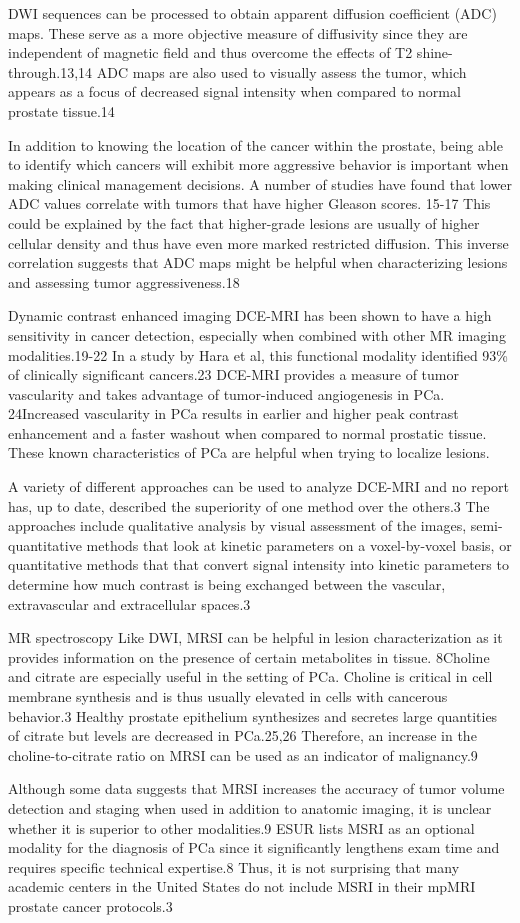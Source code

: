  DWI sequences can be processed to obtain apparent diffusion coefficient (ADC) maps. These serve as a more objective measure of diffusivity since they are independent of magnetic field and thus overcome the effects of T2 shine-through.13,14  ADC maps are also used to visually assess the tumor, which appears as a focus of decreased signal intensity when compared to normal prostate tissue.14 

 In addition to knowing the location of the cancer within the prostate, being able to identify which cancers will exhibit more aggressive behavior is important when making clinical management decisions. A number of studies have found that lower ADC values correlate with tumors that have higher Gleason scores. 15-17 This could be explained by the fact that higher-grade lesions are usually of higher cellular density and thus have even more marked restricted diffusion. This inverse correlation suggests that ADC maps might be helpful when characterizing lesions and assessing tumor aggressiveness.18 

 Dynamic contrast enhanced imaging
 DCE-MRI has been shown to have a high sensitivity in cancer detection, especially when combined with other MR imaging modalities.19-22 In a study by Hara et al, this functional modality identified 93\% of clinically significant cancers.23 DCE-MRI provides a measure of tumor vascularity and takes advantage of tumor-induced angiogenesis in PCa. 24Increased vascularity in PCa results in earlier and higher peak contrast enhancement and a faster washout when compared to normal prostatic tissue. These known characteristics of PCa are helpful when trying to localize lesions. 

 A variety of different approaches can be used to analyze DCE-MRI and no report has, up to date, described the superiority of one method over the others.3 The approaches include qualitative analysis by visual assessment of the images, semi-quantitative methods that look at kinetic parameters on a voxel-by-voxel basis, or quantitative methods that that convert signal intensity into kinetic parameters to determine how much contrast is being exchanged between the vascular, extravascular and extracellular spaces.3
    
    MR spectroscopy
    Like DWI, MRSI can be helpful in lesion characterization as it provides information on the presence of certain metabolites in tissue. 8Choline and citrate are especially useful in the setting of PCa. Choline is critical in cell membrane synthesis and is thus usually elevated in cells with cancerous behavior.3 Healthy prostate epithelium synthesizes and secretes large quantities of citrate but levels are decreased in PCa.25,26 Therefore, an increase in the choline-to-citrate ratio on MRSI can be used as an indicator of malignancy.9 

    Although some data suggests that MRSI increases the accuracy of tumor volume detection and staging when used in addition to anatomic imaging, it is unclear whether it is superior to other modalities.9 ESUR lists MSRI as an optional modality for the diagnosis of PCa since it significantly lengthens exam time and requires specific technical expertise.8 Thus, it is not surprising that many academic centers in the United States do not include MSRI in their mpMRI prostate cancer protocols.3
